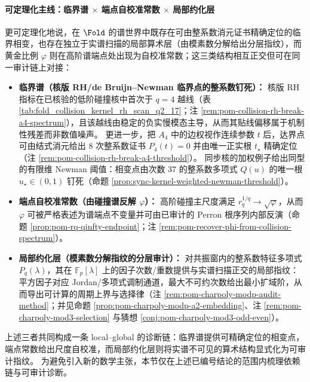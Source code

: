 \paragraph{可定理化主线：临界谱 \texorpdfstring{$\times$}{x} 端点自校准常数 \texorpdfstring{$\times$}{x} 局部约化层}
更可定理化地说，在 \(\Fold\) 的谱世界中既存在可由整系数消元证书精确定位的临界相变，也存在独立于实谱扫描的局部算术层（由模素数分解给出分层指纹），而黄金比例 \(\varphi\) 则在高阶谱端点处出现为自校准常数；这三类结构相互正交但可在同一审计链上对接：
\begin{itemize}
  \item \textbf{临界谱（核版 RH/de Bruijn--Newman 临界点的整系数钉死）：}
  核版 RH 指标在已核验的低阶碰撞核中首次于 \(q=4\) 越线（表 \ref{tab:fold_collision_kernel_rh_scan_q2_17}；注 \ref{rem:pom-collision-rh-break-a4-spectrum}），且该越线由稳定的负实慢模态主导，从而其贴线偏移属于机制性残差而非数值噪声。
  更进一步，把 \(A_4\) 中的边权视作连续参数 \(t\) 后，达界点可由结式消元给出 8 次整系数证书 \(P_4(t)=0\) 并由唯一正实根 \(t_\star\) 精确定位（注 \ref{rem:pom-collision-rh-break-a4-threshold}）。
  同步核的加权例子给出同型的有限维 Newman 阈值：相变点由次数 \(37\) 的整系数多项式 \(Q(u)\) 的唯一根 \(u_\star\in(0,1)\) 钉死（命题 \ref{prop:sync-kernel-weighted-newman-threshold}）。
  \item \textbf{端点自校准常数（由碰撞谱反解 \texorpdfstring{$\varphi$}{phi}）：}
  高阶碰撞主尺度满足 \(r_q^{1/q}\to\sqrt{\varphi}\)，从而 \(\varphi\) 可被严格表述为谱端点不变量并可由已审计的 Perron 根序列内部反演（命题 \ref{prop:pom-rq-qinfty-endpoint}；注 \ref{rem:pom-recover-phi-from-collision-spectrum}）。
  \item \textbf{局部约化层（模素数分解指纹的分层审计）：}
  对共振窗内的整系数特征多项式 \(P_q(\lambda)\)，其在 \(\mathbb{F}_p[\lambda]\) 上的因子次数/重数提供与实谱扫描正交的局部指纹：平方因子对应 Jordan/多项式调制通道，最大不可约次数给出最小扩域阶，从而导出可计算的周期上界与选择律（注 \ref{rem:pom-charpoly-modp-audit-method}；并见命题 \ref{prop:pom-charpoly-modp-a2-embedding}、注 \ref{rem:pom-charpoly-mod3-selection} 与猜想 \ref{conj:pom-charpoly-mod3-odd-even}）。
\end{itemize}
上述三者共同构成一条 local--global 的诊断链：临界谱提供可精确定位的相变点，端点常数给出尺度自校准，而局部约化层则将实谱不可见的算术结构显式化为可审计指纹。
为避免引入新的数学主张，本节仅在上述已编号结论的范围内梳理依赖链与可审计诊断。
